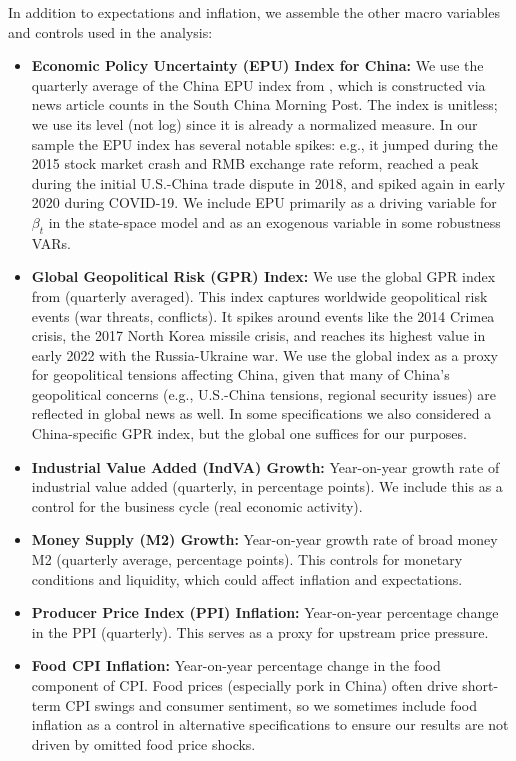 \documentclass[12pt]{article}
\begin{document}
In addition to expectations and inflation, we assemble the other macro variables and controls used in the analysis:
\begin{itemize}
    \item \textbf{Economic Policy Uncertainty (EPU) Index for China:} We use the quarterly average of the China EPU index from \cite{Baker2016}, which is constructed via news article counts in the South China Morning Post. The index is unitless; we use its level (not log) since it is already a normalized measure. In our sample the EPU index has several notable spikes: e.g., it jumped during the 2015 stock market crash and RMB exchange rate reform, reached a peak during the initial U.S.-China trade dispute in 2018, and spiked again in early 2020 during COVID-19. We include EPU primarily as a driving variable for $\beta_t$ in the state-space model and as an exogenous variable in some robustness VARs.
    \item \textbf{Global Geopolitical Risk (GPR) Index:} We use the global GPR index from \cite{Caldara2022} (quarterly averaged). This index captures worldwide geopolitical risk events (war threats, conflicts). It spikes around events like the 2014 Crimea crisis, the 2017 North Korea missile crisis, and reaches its highest value in early 2022 with the Russia-Ukraine war. We use the global index as a proxy for geopolitical tensions affecting China, given that many of China's geopolitical concerns (e.g., U.S.-China tensions, regional security issues) are reflected in global news as well. In some specifications we also considered a China-specific GPR index, but the global one suffices for our purposes.
    \item \textbf{Industrial Value Added (IndVA) Growth:} Year-on-year growth rate of industrial value added (quarterly, in percentage points). We include this as a control for the business cycle (real economic activity).
    \item \textbf{Money Supply (M2) Growth:} Year-on-year growth rate of broad money M2 (quarterly average, percentage points). This controls for monetary conditions and liquidity, which could affect inflation and expectations.
    \item \textbf{Producer Price Index (PPI) Inflation:} Year-on-year percentage change in the PPI (quarterly). This serves as a proxy for upstream price pressure.
    \item \textbf{Food CPI Inflation:} Year-on-year percentage change in the food component of CPI. Food prices (especially pork in China) often drive short-term CPI swings and consumer sentiment, so we sometimes include food inflation as a control in alternative specifications to ensure our results are not driven by omitted food price shocks.
\end{itemize}
\end{document}
